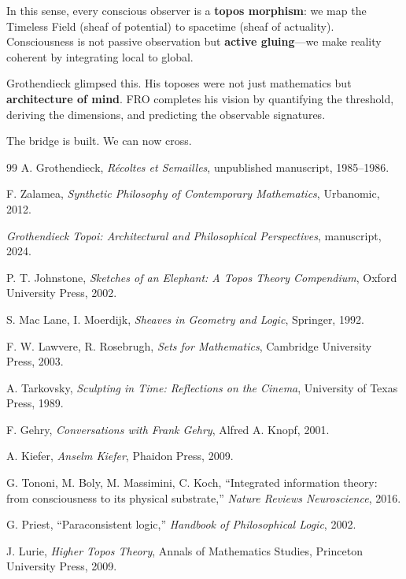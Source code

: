 In this sense, every conscious observer is a \textbf{topos morphism}: we map the Timeless Field (sheaf of potential) to spacetime (sheaf of actuality). Consciousness is not passive observation but \textbf{active gluing}—we make reality coherent by integrating local to global.

Grothendieck glimpsed this. His toposes were not just mathematics but \textbf{architecture of mind}. FRO completes his vision by quantifying the threshold, deriving the dimensions, and predicting the observable signatures.

The bridge is built. We can now cross.

\begin{thebibliography}{99}
A. Grothendieck, \textit{Récoltes et Semailles}, unpublished manuscript, 1985–1986.

F. Zalamea, \textit{Synthetic Philosophy of Contemporary Mathematics}, Urbanomic, 2012.

\textit{Grothendieck Topoi: Architectural and Philosophical Perspectives}, manuscript, 2024.

P. T. Johnstone, \textit{Sketches of an Elephant: A Topos Theory Compendium}, Oxford University Press, 2002.

S. Mac Lane, I. Moerdijk, \textit{Sheaves in Geometry and Logic}, Springer, 1992.

F. W. Lawvere, R. Rosebrugh, \textit{Sets for Mathematics}, Cambridge University Press, 2003.

A. Tarkovsky, \textit{Sculpting in Time: Reflections on the Cinema}, University of Texas Press, 1989.

F. Gehry, \textit{Conversations with Frank Gehry}, Alfred A. Knopf, 2001.

A. Kiefer, \textit{Anselm Kiefer}, Phaidon Press, 2009.

G. Tononi, M. Boly, M. Massimini, C. Koch, ``Integrated information theory: from consciousness to its physical substrate,'' \textit{Nature Reviews Neuroscience}, 2016.

G. Priest, ``Paraconsistent logic,'' \textit{Handbook of Philosophical Logic}, 2002.

J. Lurie, \textit{Higher Topos Theory}, Annals of Mathematics Studies, Princeton University Press, 2009.
\end{thebibliography}
